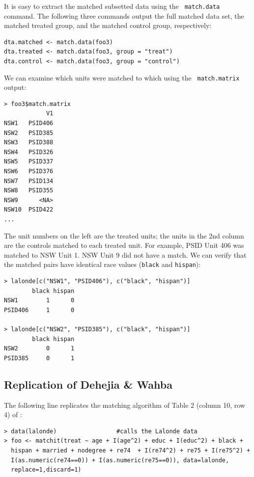 \documentclass[oneside,letterpaper,titlepage]{article}
\begin{document}
It is easy to extract the matched subsetted data using the {\tt
  match.data} command.  The following three commands output the full
matched data set, the matched treated group, and the matched control
group, respectively:

\begin{verbatim}
dta.matched <- match.data(foo3)
dta.treated <- match.data(foo3, group = "treat")
dta.control <- match.data(foo3, group = "control")
\end{verbatim}

We can examine which units were matched to which using the {\tt
  match.matrix} output:
\begin{verbatim}
> foo3$match.matrix
            V1
NSW1   PSID406
NSW2   PSID385
NSW3   PSID388
NSW4   PSID326
NSW5   PSID337
NSW6   PSID376
NSW7   PSID134
NSW8   PSID355
NSW9      <NA>
NSW10  PSID422
...  
\end{verbatim}  %

The unit numbers on the left are the treated units; the units in the
2nd column are the controls matched to each treated unit.  For
example, PSID Unit 406 was matched to NSW Unit 1.  NSW Unit 9 did not
have a match.  We can verify that the matched pairs have identical race values 
(\texttt{black} and \texttt{hispan}):

\begin{verbatim}
> lalonde[c("NSW1", "PSID406"), c("black", "hispan")]
        black hispan
NSW1        1      0
PSID406     1      0

> lalonde[c("NSW2", "PSID385"), c("black", "hispan")]
        black hispan
NSW2        0      1
PSID385     0      1
\end{verbatim}


\subsection{Replication of Dehejia \& Wahba}

The following line replicates the matching algorithm of Table 2
(column 10, row 4) of \citet{DehWah99}:

\begin{verbatim}
> data(lalonde)                 #calls the Lalonde data
> foo <- matchit(treat ~ age + I(age^2) + educ + I(educ^2) + black +
  hispan + married + nodegree + re74  + I(re74^2) + re75 + I(re75^2) +
  I(as.numeric(re74==0)) + I(as.numeric(re75==0)), data=lalonde,
  replace=1,discard=1)
\end{verbatim}
\end{document}
